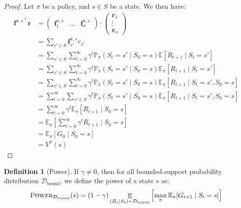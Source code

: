\documentclass{article}
\theoremstyle{definition}
\newtheorem{definition}{Definition}[section]
\theoremstyle{remark}
\theoremstyle{example}
\DeclareMathOperator*{\opE}{\mathbb{E}}
\newcommand*{\rf}{\mathbf{r}}           %
\newcommand*{\f}{\mathbf{f}}            %
\newcommand*{\D}{\mathcal{D}}
\newcommand*{\Dbd}{{\D_{\text{bound}}}} %
\newcommand*{\brx}[1]{\left[#1\right]}  %
\newcommand*{\E}[2]{\opE_{#1}\brx{#2}}  %
\newcommand*{\pwr}{\textsc{Power}}
\begin{document}
\begin{proof}
		Let $\pi$ be a policy, and $s \in S$ be a state. We then have:
		\begin{align*}
				{\f^{\pi,s}}^\top \rf &= \begin{pmatrix} \f^{\pi,s}_1 & \dots & \f^{\pi,s}_n \end{pmatrix} \cdot \begin{pmatrix} \rf_1 \\ \vdots \\ \rf_n \end{pmatrix}\\
														   &= \sum_{s' \in S} \f^{\pi,s}_{s'} r_{s'}\\
														   &= \sum_{s' \in S} \sum_{t=0}^\infty \gamma^t \mathbb{P}_\pi(S_t = s' \mid S_0 = s)\mathbb{E}[R_{t+1} \mid S_t = s']\\
														   &= \sum_{s' \in S} \sum_{t=0}^\infty \gamma^t \mathbb{P}_\pi(S_t = s' \mid S_0 = s)\mathbb{E}_\pi[R_{t+1} \mid S_t = s']\\
														   &= \sum_{s' \in S} \sum_{t=0}^\infty \gamma^t \mathbb{P}_\pi(S_t = s' \mid S_0 = s)\mathbb{E}_\pi[R_{t+1} \mid S_t = s', S_0 = s]\\
														   &= \sum_{t=0}^\infty \sum_{s' \in S} \gamma^t \mathbb{P}_\pi(S_t = s' \mid S_0 = s)\mathbb{E}_\pi[R_{t+1} \mid S_t = s', S_0 = s]\\
														   &= \sum_{t=0}^\infty \gamma^t \mathbb{E}_\pi[R_{t+1} \mid S_0 = s]\\
														   &= \mathbb{E}_\pi[\sum_{t=0}^\infty \gamma^t R_{t+1} \mid S_0 = s]\\
														   &= \mathbb{E}_\pi[G_0 \mid S_0 = s]\\
														   &= V^\pi(s)
		\end{align*}
\end{proof}

\begin{definition}[Power]
		If $\gamma \neq 0$, then for all bounded-support probability distribution $\Dbd$, we define the power of a state $s$ as:
				$$\pwr_\Dbd(s) = (1 - \gamma) \E{(R_1 \mid S_0) \sim \Dbd}{\max_\pi \mathbb{E}_\pi[G_{t+1} \mid S_t = s]}$$
\end{definition}

\end{document}
